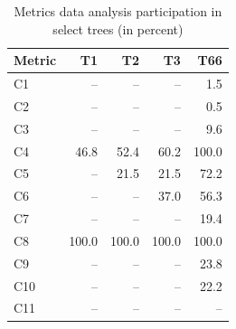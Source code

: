 \begin{table}[t]
	\centering
	\caption{Metrics data analysis participation in select trees (in percent)}
	\label{tab:participation}
	\small
	\begin{tabular}{lrrrr}
	Metric 	& T1 	& T2	& T3 	& T66 	\\ 
	\hline
	C1 		& --	& --	& -- 	& 1.5	\\
	C2 		& -- 	& --	& -- 	& 0.5	\\
	C3 		& -- 	& -- 	& -- 	& 9.6	\\
	\rowcolor{light-light-gray}
	C4 		& 46.8	& 52.4	& 60.2	& 100.0	\\
	\rowcolor{light-light-gray}
	C5 		& -- 	& 21.5	& 21.5	& 72.2	\\
	\rowcolor{light-light-gray}
	C6 		& -- 	& -- 	& 37.0	& 56.3	\\
	C7 		& -- 	& -- 	& -- 	& 19.4	\\
	\rowcolor{light-light-gray}
	C8 		& 100.0	& 100.0	& 100.0	& 100.0	\\
	C9 		& -- 	& -- 	& --	& 23.8	\\
	C10		& -- 	& -- 	& -- 	& 22.2	\\
	C11		& -- 	& -- 	& -- 	& -- 	\\
	\hline
	\end{tabular}
\end{table}

